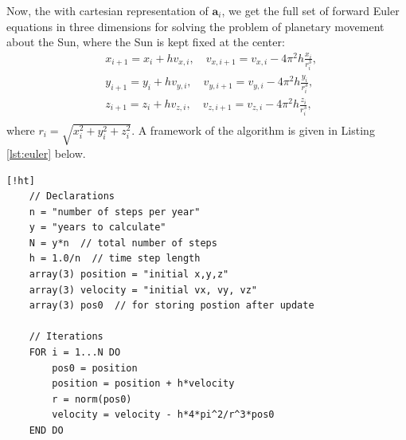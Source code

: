 \documentclass[]{article}
\begin{document}
Now, the with cartesian representation of $\mathbf{a}_i$, we get the full set of forward Euler equations in three dimensions for solving the problem of planetary movement about the Sun, where the Sun is kept fixed at the center:
\begin{equation} \label{euler-fwd}
\begin{aligned}
	&x_{i+1} = x_i + hv_{x,i} ,\quad v_{x,i+1} = v_{x,i} - 4\pi^2h\frac{x_i}{r_i^3} ,\\
	&y_{i+1} = y_i + hv_{y,i} ,\quad v_{y,i+1} = v_{y,i} - 4\pi^2h\frac{y_i}{r_i^3} ,\\
	&z_{i+1} = z_i + hv_{z,i} ,\quad v_{z,i+1} = v_{z,i} - 4\pi^2h\frac{z_i}{r_i^3} ,\\
\end{aligned}
\end{equation}
where $r_i = \sqrt{x_i^2 + y_i^2 + z_i^2}$. A framework of the algorithm is given in Listing \ref{lst:euler} below.

\begin{lstlisting}[caption={Euler's Forward algorithm for Sun-Earth system with fixed Sun.},label={lst:euler}] [!ht]
	// Declarations
	n = "number of steps per year"
	y = "years to calculate"
	N = y*n  // total number of steps
	h = 1.0/n  // time step length
	array(3) position = "initial x,y,z"
	array(3) velocity = "initial vx, vy, vz"
	array(3) pos0  // for storing postion after update
	
	// Iterations
	FOR i = 1...N DO
		pos0 = position
		position = position + h*velocity
		r = norm(pos0)
		velocity = velocity - h*4*pi^2/r^3*pos0
	END DO
\end{lstlisting}
\end{document}
